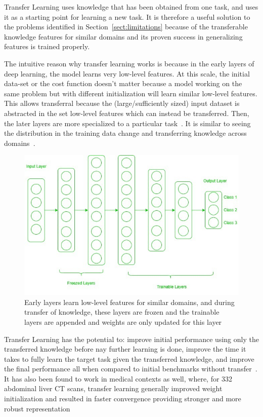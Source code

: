 \documentclass[11pt,twoside]{report}
\begin{document}
Transfer Learning uses knowledge that has been obtained from one task, and uses it as a starting point for learning a new task. It is therefore a useful solution to the problems identified in Section~\ref{sect:limitations} because of the transferable knowledge features for similar domains  and its proven success in generalizing features is trained properly.

The intuitive reason why transfer learning works is because in the early layers of deep learning, the model learns very low-level features. At this scale, the initial data-set or the cost function doesn't matter because a model working on the same problem but with different initialization will learn similar low-level features. This allows transferral because the (large/sufficiently sized) input dataset is abstracted in the set low-level features which can instead be transferred. Then, the later layers are more specialized to a particular task~\cite{deep-learning-book}. It is similar to seeing the distribution in the training data change and transferring knowledge across domains~\cite{survey-on-transfer-learning}.

\begin{figure}[H]
  \centering
  \includegraphics[width=0.7\linewidth]{../figures/Frozen-layers.jpg}
  \caption{Early layers learn low-level features for similar domains, and during transfer of knowledge, these layers are frozen and the trainable layers are appended and weights are only updated for this layer~\cite{geeks-transfer-learning}}
 \label{fig:frozen-layers}
\end{figure}

Transfer Learning has the potential to: improve initial performance using only the transferred knowledge before nay further learning is done, improve the time it takes to fully learn the target task given the transferred knowledge, and improve the final performance all when compared to initial benchmarks without transfer~\cite{torrey-handbook}. It has also been found to work in medical contexts as well, where, for 332 abdominal liver CT scans, transfer learning generally improved weight initialization and resulted in faster convergence providing stronger and more robust representation~\cite{liver-lesion-via-transfer-learning}
\end{document}
